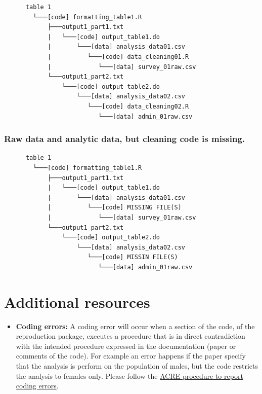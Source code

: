 \documentclass[]{book}
\providecommand{\tightlist}{%
  \setlength{\itemsep}{0pt}\setlength{\parskip}{0pt}}
\begin{document}
\begin{verbatim}
      table 1
        └───[code] formatting_table1.R
            ├───output1_part1.txt  
            |   └───[code] output_table1.do           
            |       └───[data] analysis_data01.csv
            |          └───[code] data_cleaning01.R
            |             └───[data] survey_01raw.csv
            └───output1_part2.txt  
                └───[code] output_table2.do           
                    └───[data] analysis_data02.csv
                       └───[code] data_cleaning02.R
                          └───[data] admin_01raw.csv  
\end{verbatim}

\hypertarget{raw-data-and-analytic-data-but-cleaning-code-is-missing.}{%
\subsection{Raw data and analytic data, but cleaning code is missing.}\label{raw-data-and-analytic-data-but-cleaning-code-is-missing.}}

\begin{verbatim}
      table 1
        └───[code] formatting_table1.R
            ├───output1_part1.txt  
            |   └───[code] output_table1.do           
            |       └───[data] analysis_data01.csv
            |          └───[code] MISSING FILE(S)
            |             └───[data] survey_01raw.csv
            └───output1_part2.txt  
                └───[code] output_table2.do           
                    └───[data] analysis_data02.csv
                       └───[code] MISSIN FILE(S)
                          └───[data] admin_01raw.csv  
\end{verbatim}

\hypertarget{additional-resources}{%
\chapter{Additional resources}\label{additional-resources}}

\begin{itemize}
\tightlist
\item
  \textbf{Coding errors:} A coding error will occur when a section of the code, of the reproduction package, executes a procedure that is in direct contradiction with the intended procedure expressed in the documentation (paper or comments of the code). For example an error happens if the paper specify that the analysis is perform on the population of males, but the code restricts the analysis to females only. Please follow the \href{ADD\%20LINK}{ACRE procedure to report coding errors}.
\end{itemize}
\end{document}
